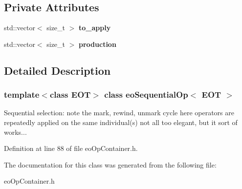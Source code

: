 \subsection*{Private Attributes}
\begin{CompactItemize}
\item 
std::vector$<$ size\_\-t $>$ {\bf to\_\-apply}\label{classeo_sequential_op_r0}

\item 
std::vector$<$ size\_\-t $>$ {\bf production}\label{classeo_sequential_op_r1}

\end{CompactItemize}


\subsection{Detailed Description}
\subsubsection*{template$<$class EOT$>$ class eo\-Sequential\-Op$<$ EOT $>$}

Sequential selection: note the mark, rewind, unmark cycle here operators are repeatedly applied on the same individual(s) not all too elegant, but it sort of works... 



Definition at line 88 of file eo\-Op\-Container.h.

The documentation for this class was generated from the following file:\begin{CompactItemize}
\item 
eo\-Op\-Container.h\end{CompactItemize}
